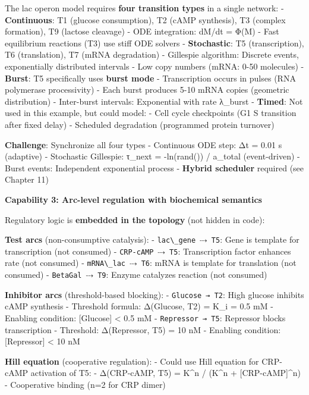 The lac operon model requires \textbf{four transition types} in a single
network: - \textbf{Continuous}: T1 (glucose consumption), T2 (cAMP
synthesis), T3 (complex formation), T9 (lactose cleavage) - ODE
integration: dM/dt = Φ(M) - Fast equilibrium reactions (T3) use stiff
ODE solvers - \textbf{Stochastic}: T5 (transcription), T6 (translation),
T7 (mRNA degradation) - Gillespie algorithm: Discrete events,
exponentially distributed intervals - Low copy numbers (mRNA: 0-50
molecules) - \textbf{Burst}: T5 specifically uses \textbf{burst mode} -
Transcription occurs in pulses (RNA polymerase processivity) - Each
burst produces 5-10 mRNA copies (geometric distribution) - Inter-burst
intervals: Exponential with rate λ\_burst - \textbf{Timed}: Not used in
this example, but could model: - Cell cycle checkpoints (G1 \textrightarrow S
transition after fixed delay) - Scheduled degradation (programmed
protein turnover)

\textbf{Challenge}: Synchronize all four types - Continuous ODE step: Δt
= 0.01 s (adaptive) - Stochastic Gillespie: τ\_next = -ln(rand()) /
a\_total (event-driven) - Burst events: Independent exponential process
- \textbf{Hybrid scheduler} required (see Chapter 11)

\textbf{Capability 3: Arc-level regulation with biochemical semantics}

Regulatory logic is \textbf{embedded in the topology} (not hidden in
code):

\textbf{Test arcs} (non-consumptive catalysis): -
\passthrough{\lstinline!lac\_gene ⤏ T5!}: Gene is template for
transcription (not consumed) - \passthrough{\lstinline!CRP-cAMP ⤏ T5!}:
Transcription factor enhances rate (not consumed) -
\passthrough{\lstinline!mRNA\_lac ⤏ T6!}: mRNA is template for
translation (not consumed) - \passthrough{\lstinline!BetaGal ⤏ T9!}:
Enzyme catalyzes reaction (not consumed)

\textbf{Inhibitor arcs} (threshold-based blocking): -
\passthrough{\lstinline!Glucose ⊸ T2!}: High glucose inhibits cAMP
synthesis - Threshold formula: Δ(Glucose, T2) = K\_i = 0.5 mM - Enabling
condition: {[}Glucose{]} \textless{} 0.5 mM -
\passthrough{\lstinline!Repressor ⊸ T5!}: Repressor blocks transcription
- Threshold: Δ(Repressor, T5) = 10 nM - Enabling condition:
{[}Repressor{]} \textless{} 10 nM

\textbf{Hill equation} (cooperative regulation): - Could use Hill
equation for CRP-cAMP activation of T5: - Δ(CRP-cAMP, T5) = K\^{}n /
(K\^{}n + {[}CRP-cAMP{]}\^{}n) - Cooperative binding (n=2 for CRP dimer)

